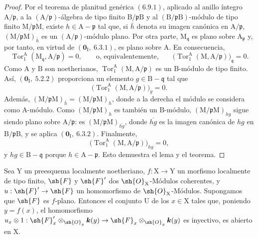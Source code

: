 \begin{proof}

Por el teorema de planitud genérica $(6.9.1)$, aplicado al anillo íntegro
$\mathrm{A}/\mathfrak{p}$, a la
$(\mathrm{A}/\mathfrak{p})$-álgebra de tipo finito
$\mathrm{B}/\mathfrak{p}\mathrm{B}$ y al
$(\mathrm{B}/\mathfrak{p}\mathrm{B})$-módulo de tipo finito
$\mathrm{M}/\mathfrak{p}\mathrm{M}$, existe
$h\in\mathrm{A}-\mathfrak{p}$ tal que, si $\bar h$ denota su imagen canónica
en $\mathrm{A}/\mathfrak{p}$,
$(\mathrm{M}/\mathfrak{p}\mathrm{M})_{\bar h}$ es un
$(\mathrm{A}/\mathfrak{p})$-módulo plano. Por otra parte,
$\mathrm{M}_{\mathfrak q}$ es plano sobre $\mathrm{A}_{\mathfrak p}$ y,
por tanto, en virtud de $(\mathbf{0}_\mathrm{I},~6.3.1)$, es plano sobre $\mathrm{A}$.
En consecuencia,
\[
  \operatorname{Tor}_1^\mathrm{A}
  (\mathrm{M}_{\mathfrak q},\mathrm{A}/\mathfrak p)=0,
  \qquad\text{o, equivalentemente,}\qquad
  \bigl(\operatorname{Tor}_1^\mathrm{A}
  (\mathrm{M},\mathrm{A}/\mathfrak p)\bigr)_{\mathfrak q}=0.
\]
Como $\mathrm{A}$ y $\mathrm{B}$ son noetherianos,
$\operatorname{Tor}_1^\mathrm{A}
(\mathrm{M},\mathrm{A}/\mathfrak p)$ es un $\mathrm{B}$-módulo de tipo finito.
Así, $(\mathbf{0}_\mathrm{I},~5.2.2)$ proporciona un elemento
$g\in\mathrm{B}-\mathfrak q$ tal que
\[
  \bigl(\operatorname{Tor}_1^\mathrm{A}
  (\mathrm{M},\mathrm{A}/\mathfrak p)\bigr)_g=0.
\]
Además,
$(\mathrm{M}/\mathfrak p\mathrm{M})_{\bar h}
=(\mathrm{M}/\mathfrak p\mathrm{M})_h$, donde a la derecha el módulo se
considera como $\mathrm{A}$-módulo. Como
$(\mathrm{M}/\mathfrak p\mathrm{M})_h$ es también un $\mathrm{B}$-módulo,
$(\mathrm{M}/\mathfrak p\mathrm{M})_{hg}$ sigue siendo plano sobre
$\mathrm{A}/\mathfrak p$: es
$(\mathrm{M}/\mathfrak p\mathrm{M})_{\overline{hg}}$, donde
$\overline{hg}$ es la imagen canónica de $hg$ en
$\mathrm{B}/\mathfrak p\mathrm{B}$, y se aplica
$(\mathbf{0}_\mathrm{I},~6.3.2)$. Finalmente,
\[
  \bigl(\operatorname{Tor}_1^\mathrm{A}
  (\mathrm{M},\mathrm{A}/\mathfrak p)\bigr)_{hg}=0,
\]
y $hg\in\mathrm{B}-\mathfrak q$ porque
$h\in\mathrm{A}-\mathfrak p$. Esto demuestra el lema y el teorema.
\end{proof}

\begin{corollary}[11.1.2]
\label{IV.11.1.2}
Sea $\mathrm{Y}$ un preesquema localmente noetheriano, $f:\mathrm{X}\to\mathrm{Y}$ un morfismo localmente de tipo finito, $\sh{F}$ y $\sh{F}'$ dos $\sh{O}_\mathrm{X}$-Módulos coherentes, y $u:\sh{F}'\to\sh{F}$ un homomorfismo de $\sh{O}_\mathrm{X}$-Módulos. Supongamos que $\sh{F}$ es $f$-plano. Entonces el conjunto $\mathrm{U}$ de los $x\in\mathrm{X}$ tales que, poniendo $y=f(x)$, el homomorfismo $u_x\otimes 1:\sh{F}'_x\otimes_{\sh{O}_y}\boldsymbol{k}(y)\to\sh{F}_x\otimes_{\sh{O}_y}\boldsymbol{k}(y)$ es inyectivo, es abierto en $\mathrm{X}$.
\end{corollary}

